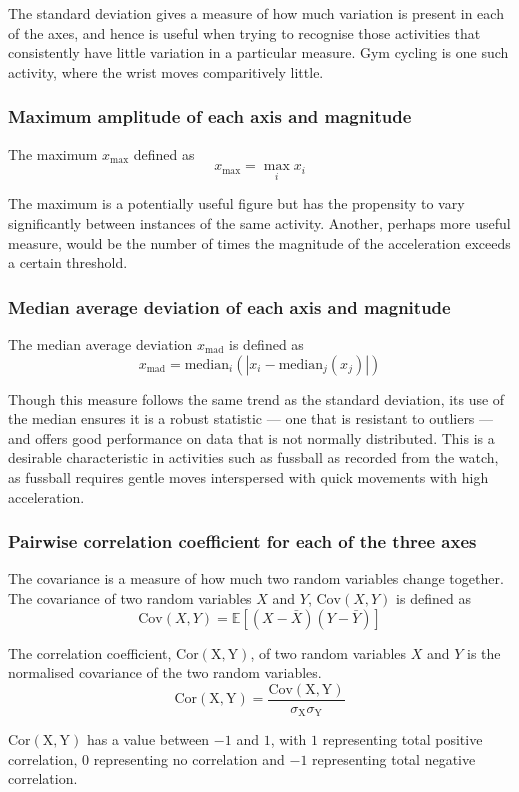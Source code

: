         The standard deviation gives a measure of how much variation is present in each of the axes, and hence is useful when trying to recognise those activities that consistently have little variation in a particular measure. Gym cycling is one such activity, where the wrist moves comparitively little.
      \subsubsection{Maximum amplitude of each axis and magnitude}
        The maximum $x_{\max}$ defined as $$x_{\max} = \max_i x_i $$
        
        The maximum is a potentially useful figure but has the propensity to vary significantly between instances of the same activity. Another, perhaps more useful measure, would be the number of times the magnitude of the acceleration exceeds a certain threshold. 
      \subsubsection{Median average deviation of each axis and magnitude}
        The median average deviation $x_\mathrm{mad}$ is defined as $$x_\mathrm{mad} = \mathrm{median}_i (|x_i - \mathrm{median}_j(x_j)|)$$
        
        Though this measure follows the same trend as the standard deviation, its use of the median ensures it is a robust statistic --- one that is resistant to outliers --- and offers good performance on data that is not normally distributed. This is a desirable characteristic in activities such as fussball as recorded from the watch, as fussball requires gentle moves interspersed with quick movements with high acceleration.
      \subsubsection{Pairwise correlation coefficient for each of the three axes}
        The covariance is a measure of how much two random variables change together. The covariance of two random variables $X$ and $Y$, $\mathrm{Cov}(X, Y)$ is defined as $$\mathrm{Cov}(X, Y) = \mathbb{E}[(X - \bar{X})(Y - \bar{Y})]$$
        
        The correlation coefficient, $\mathrm{Cor(X,Y)}$, of two random variables $X$ and $Y$ is the normalised covariance of the two random variables. $$\mathrm{Cor(X,Y)} = \frac{\mathrm{Cov(X,Y)}}{\sigma_{\mathrm{X}}\sigma_{\mathrm{Y}}}$$
        
        $\mathrm{Cor(X,Y)}$ has a value between $-1$ and $1$, with $1$ representing total positive correlation, $0$ representing no correlation and $-1$ representing total negative correlation.
         
